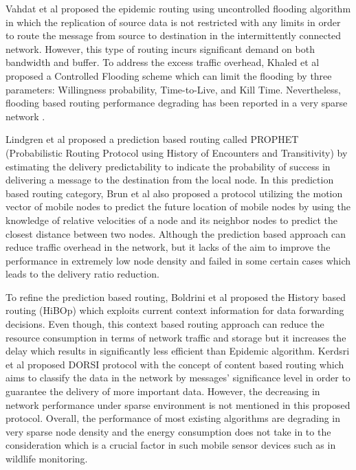 Vahdat et al \cite{Vahdat2000} proposed the epidemic routing using  uncontrolled flooding algorithm in which the replication of source data is not restricted with any limits in order to route the message from source to destination in the intermittently connected network.
However, this type of routing incurs significant demand on both bandwidth and buffer.
To address the excess traffic overhead, Khaled et al \cite{Harras2005} proposed a Controlled Flooding  scheme which can limit the flooding by three parameters: Willingness probability, Time-to-Live, and Kill Time.
Nevertheless, flooding based routing performance degrading has been reported in a very sparse network \cite{Neena2013}.

Lindgren et al \cite{Lindgren2003} proposed a prediction based routing called PROPHET (Probabilistic Routing Protocol using History of Encounters and Transitivity) by estimating the delivery predictability to indicate the probability of success in delivering a message to the destination from the local node.
In this prediction based routing category, Brun et al \cite{Brendan2005}  also proposed a protocol utilizing the motion vector of mobile nodes to predict the future location of mobile nodes by using the knowledge of relative velocities of a node and its neighbor nodes to predict the closest distance between two nodes.
Although the prediction based approach can reduce traffic overhead in the network, but it lacks of the aim to improve the performance in extremely low node density and failed in some certain cases which leads to the delivery ratio reduction.

To refine the prediction based routing,  Boldrini et al \cite{Boldrini2007}  proposed the History based routing (HiBOp) which exploits current context information for data forwarding decisions.
Even though, this context based routing approach can reduce the resource consumption in terms of network traffic and storage but it increases the delay which results in significantly less efficient than Epidemic algorithm.
Kerdsri et al \cite{Kerdsri2013} proposed DORSI protocol with the concept of content based routing which aims to classify the data in the network by messages' significance level in order to guarantee the delivery of more important data. 
However, the decreasing in network performance under sparse environment is not mentioned in this proposed protocol.
Overall, the performance of most existing algorithms are degrading in very sparse node density and the energy consumption does not take in to the consideration which is a crucial factor in such mobile sensor devices such as in wildlife monitoring.


